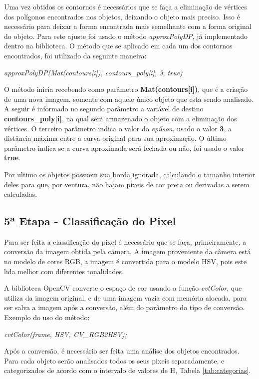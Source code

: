 Uma vez obtidos os contornos é necessários que se faça a eliminação de vértices dos polígonos encontrados nos objetos, deixando o objeto mais preciso. Isso é necessário para deixar a forma encontrada mais semelhante com a forma original do objeto. Para este ajuste foi usado o método \textit{approxPolyDP}, já implementado dentro na biblioteca. O método que se aplicado em cada um dos contornos encontrados, foi utilizado da seguinte maneira:
\begin{center}
\centering \textit{    approxPolyDP(Mat(contours[i]), contours\_poly[i], 3, true)}
\end{center}
O método inicia recebendo como parâmetro \textbf{Mat(contours[i])}, que é a criação de uma nova imagem, somente com aquele único objeto que esta sendo analisado. A seguir é informado no segundo parâmetro a variável de destino \textbf{contours\_poly[i]}, na qual será armazenado o objeto com a eliminação dos vértices. O terceiro parâmetro indica o valor do \textit{epilson}, usado o valor \textbf{3}, a distância máxima entre a curva original para sua aproximação\cite{OpenCV}. O último parâmetro indica se a curva aproximada será fechada ou não, foi usado o valor \textbf{true}.

Por ultimo os objetos possuem sua borda ignorada, calculando o tamanho interior deles para que, por ventura, não hajam pixeis de cor preta ou derivadas a serem calculadas.
 
 \subsection{5ª Etapa - Classificação do Pixel}

 
 
 Para ser feita a classificação do pixel é necessário que se faça, primeiramente, a conversão da imagem obtida pela câmera. A imagem proveniente da câmera está no modelo de cores RGB, a imagem é convertida para o modelo HSV, pois este lida melhor com diferentes tonalidades.
  
 A biblioteca OpenCV converte o espaço de cor usando a função \textit{cvtColor}, que utiliza da imagem original, e de uma imagem vazia com memória alocada, para ser salva a imagem após a conversão, além do parâmetro do tipo de conversão. Exemplo do uso do método:
\begin{center}
\centering \textit{cvtColor(frame, HSV, CV\_RGB2HSV);}
\end{center}

Após a conversão, é necessário ser feita uma análise dos objetos encontrados. Para cada objeto serão analisados todos os seus pixeis separadamente, e categorizados de acordo com o intervalo de valores de H, Tabela \ref{tab:categorias}.

